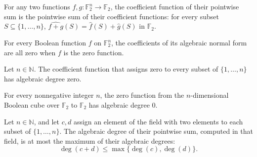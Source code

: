 \begin{theorem}
\label{FABL.anfCoeff_add}
\leanok
{}
For any two functions $f,g:\mathbb F_2^n\to\mathbb F_2$, the coefficient function of
their pointwise sum is the pointwise sum of their coefficient functions: for every
subset $S\subseteq\{1,\ldots,n\}$, $\widehat{f+g}(S)=\widehat f(S)+\widehat g(S)$ in
$\mathbb F_2$.
\end{theorem}

\begin{theorem}
\label{FABL.anfCoeff_zero}
\leanok
{}
For every Boolean function $f$ on $
\mathbb{F}_2^n$, the coefficients of its algebraic normal form are all zero when $f$ is
the zero function.
\end{theorem}

\begin{theorem}
\label{FABL.algebraicDegree_zero}
\leanok
{}
Let $n\in\mathbb N$. The coefficient function that assigns zero to every subset of
$\{1,\ldots,n\}$ has algebraic degree zero.
\end{theorem}

\begin{theorem}
\label{FABL.functionAlgebraicDegree_zero}
\leanok
{}
For every nonnegative integer $n$, the zero function from the $n$-dimensional Boolean
cube over $\mathbb{F}_2$ to $\mathbb{F}_2$ has algebraic degree $0$.
\end{theorem}

\begin{theorem}
\label{FABL.algebraicDegree_add_le_max}
\leanok
{}
Let $n\in\mathbb N$, and let $c,d$ assign an element of the field with two elements to
each subset of $\{1,\ldots,n\}$. The algebraic degree of their pointwise sum, computed
in that field, is at most the maximum of their algebraic degrees:
\[
\deg(c+d)\le\max\{\deg(c),\deg(d)\}.
\]
\end{theorem}

